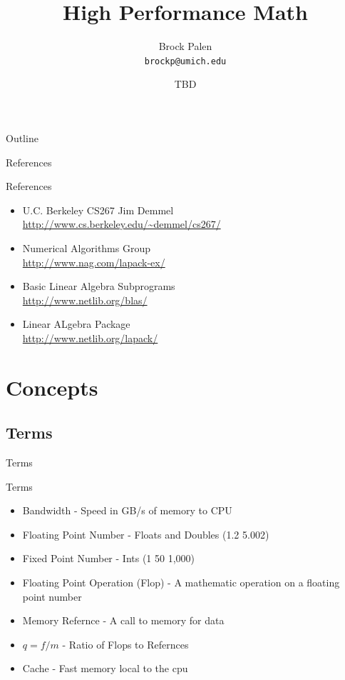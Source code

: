 \documentclass[handout]{beamer}
\title[CAC High Performance Math] {High Performance Math}
\author{Brock Palen\\ \texttt{brockp@umich.edu}}
\date{TBD}
\begin{document}
  \begin{frame}
    \titlepage
  \end{frame}

  \begin{frame}{Outline}
    \tableofcontents
  \end{frame}
 
\begin{frame}{References}
 \begin{block}{References}
  \begin{itemize}
   \item U.C. Berkeley CS267 Jim Demmel \\
     \url{http://www.cs.berkeley.edu/~demmel/cs267/}
   \item Numerical Algorithms Group     \\
     \url{http://www.nag.com/lapack-ex/}
   \item Basic Linear Algebra Subprograms \\
     \url{http://www.netlib.org/blas/}
   \item Linear ALgebra Package         \\
     \url{http://www.netlib.org/lapack/}
  \end{itemize}
 \end{block}
\end{frame} 



\section{Concepts}
\subsection{Terms}
\begin{frame}{Terms}
 \begin{block}{Terms}
  \begin{itemize}
   \item<1-> Bandwidth - Speed in GB/s of memory to CPU
   \item<2-> Floating Point Number - Floats and Doubles (1.2 5.002)
   \item<2-> Fixed Point Number - Ints (1 50 1,000)
   \item<3-> Floating Point Operation (Flop) - A mathematic operation on a floating point number
   \item<4-> Memory Refernce - A call to memory for data
   \item<5->  $q=f/m$ - Ratio of Flops to Refernces
   \item<6-> Cache - Fast memory local to the cpu
  \end{itemize}
 \end{block}
\end{frame}
\end{document}
